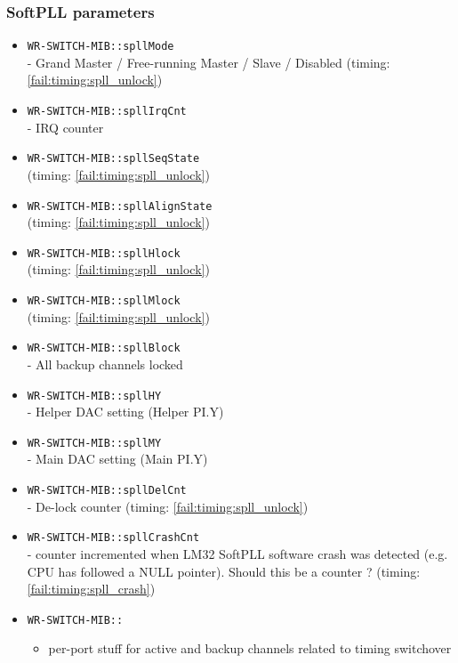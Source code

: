 \subsubsection{SoftPLL parameters}
\begin{itemize}[leftmargin=0pt]
	\item [] \texttt{WR-SWITCH-MIB::spllMode}\\ - Grand Master / Free-running
		Master / Slave / Disabled (timing: \ref{fail:timing:spll_unlock})
	\item [] \texttt{WR-SWITCH-MIB::spllIrqCnt}\\ - IRQ counter
	\item [] \texttt{WR-SWITCH-MIB::spllSeqState}\\ (timing:
		\ref{fail:timing:spll_unlock})
	\item [] \texttt{WR-SWITCH-MIB::spllAlignState}\\ (timing:
		\ref{fail:timing:spll_unlock})
	\item [] \texttt{WR-SWITCH-MIB::spllHlock}\\ (timing:
		\ref{fail:timing:spll_unlock})
	\item [] \texttt{WR-SWITCH-MIB::spllMlock}\\ (timing:
		\ref{fail:timing:spll_unlock})
	\item [] \texttt{WR-SWITCH-MIB::spllBlock}\\ - All backup channels locked
	\item [] \texttt{WR-SWITCH-MIB::spllHY}\\ - Helper DAC setting (Helper PI.Y)
	\item [] \texttt{WR-SWITCH-MIB::spllMY}\\ - Main DAC setting (Main PI.Y)
	\item [] \texttt{WR-SWITCH-MIB::spllDelCnt}\\ - De-lock counter (timing:
		\ref{fail:timing:spll_unlock})
	\item [] \texttt{WR-SWITCH-MIB::spllCrashCnt}\\ - counter incremented when
		LM32 SoftPLL software crash was detected (e.g. CPU has followed a NULL
		pointer). Should this be a counter ? (timing: \ref{fail:timing:spll_crash})
	\item [] \texttt{WR-SWITCH-MIB::}
		\begin{itemize}[topsep=-12pt]
			\item per-port stuff for active and backup channels related to timing
				switchover
		\end{itemize}
\end{itemize}

